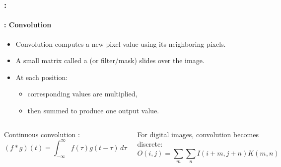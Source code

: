 \documentclass[xcolor=table]{beamer}
\begin{document}
\begin{frame}
	\frametitle{\insertshortsubtitle: \insertsection}
	\framesubtitle{\insertsubsection: Convolution}
	
	\begin{itemize}
		
		\item Convolution computes a new pixel value using its neighboring pixels.
		
		\item A small matrix called a  (or filter/mask) slides over the image.
		
		\item At each position:
		\begin{itemize}
			\item corresponding values are multiplied,
			\item then summed to produce one output value.
		\end{itemize}
	\end{itemize}
		
	\begin{columns}
		
		
		Continuous convolution \cite{1973-rudin}:
		\[
		(f * g)(t)=\int_{-\infty}^{\infty} f(\tau)g(t-\tau)\,d\tau
		\]
		
		
		For digital images, convolution becomes discrete:
		\[
		O(i,j)=\sum_m \sum_n I(i+m,j+n) K(m,n)
		\]
	\end{columns}
			
	
	\begin{center}
	\end{center}
	
\end{frame}
\end{document}
